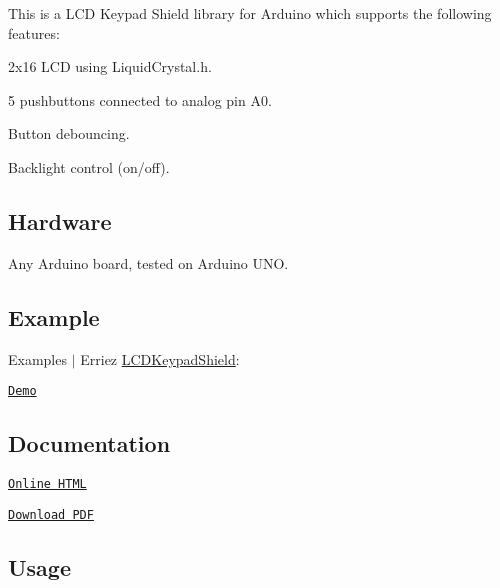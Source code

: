 \href{https://travis-ci.org/Erriez/ErriezLCDKeypadShield}{\tt }

This is a L\+CD Keypad Shield library for Arduino which supports the following features\+:


\begin{DoxyItemize}
\item 2x16 L\+CD using {\ttfamily Liquid\+Crystal.\+h}.
\item 5 pushbuttons connected to analog pin A0.
\item Button debouncing.
\item Backlight control (on/off).
\end{DoxyItemize}

\subsection*{Hardware}

Any Arduino board, tested on Arduino U\+NO.



\subsection*{Example}

Examples $\vert$ Erriez \hyperlink{class_l_c_d_keypad_shield}{L\+C\+D\+Keypad\+Shield}\+:


\begin{DoxyItemize}
\item \href{https://github.com/Erriez/ErriezLCDKeypadShield/blob/master/examples/Demo/Demo.ino}{\tt Demo}
\end{DoxyItemize}

\subsection*{Documentation}


\begin{DoxyItemize}
\item \href{https://Erriez.github.io/ErriezLCDKeypadShield}{\tt Online H\+T\+ML}
\item \href{https://github.com/Erriez/ErriezLCDKeypadShield/raw/gh-pages/latex/ErriezLCDKeypadShield.pdf}{\tt Download P\+DF}
\end{DoxyItemize}

\subsection*{Usage}

